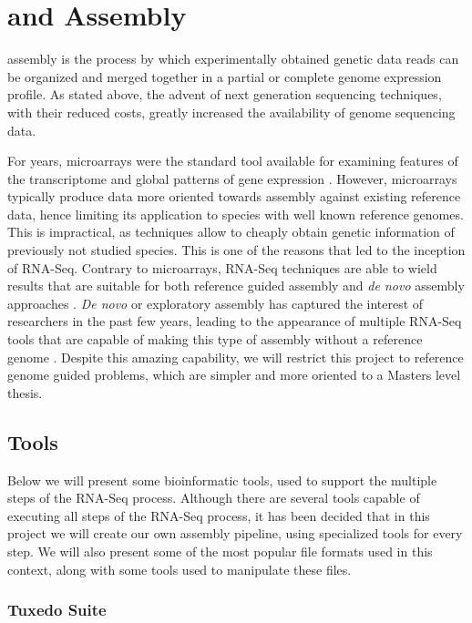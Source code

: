 \section{\rnaseq{} and \Trans{} Assembly}\label{sec:assembly}

\Trans{} assembly is the process by which experimentally obtained genetic data
reads can be organized and merged together in a partial or complete genome
expression profile. As stated above, the advent of next generation sequencing
techniques, with their reduced costs, greatly increased the availability of
genome sequencing data.

For years, microarrays were the standard tool available for examining features
of the transcriptome and global patterns of gene expression \cite{Wolf2013}.
However, microarrays typically produce data more oriented towards assembly
against existing reference data, hence limiting its application to species with
well known reference genomes. This is impractical, as \ngs{} techniques allow to
cheaply obtain genetic information of previously not studied species. This is
one of the reasons that led to the inception of RNA-Seq. Contrary to
microarrays, RNA-Seq techniques are able to wield results that are suitable for
both reference guided assembly and \textit{de novo} assembly approaches
\cite{Wilhelm2009}. \textit{De novo} or exploratory assembly has captured the
interest of researchers in the past few years, leading to the appearance of
multiple RNA-Seq tools that are capable of making this type of assembly without
a reference genome \cite{nuno11:assemblathon}. Despite this amazing capability,
we will restrict this project to reference genome guided problems, which are
simpler and more oriented to a Masters level thesis.

\subsection{\rnaseq{} Tools}\label{sec:seqtools}

Below we will present some bioinformatic tools, used to support the multiple
steps of the RNA-Seq process. Although there are several tools capable of
executing all steps of the RNA-Seq process, it has been decided that in this
project we will create our own assembly pipeline, using specialized tools for
every step. We will also present some of the most popular file formats used in
this context, along with some tools used to manipulate these files.

\subsubsection*{Tuxedo Suite}

